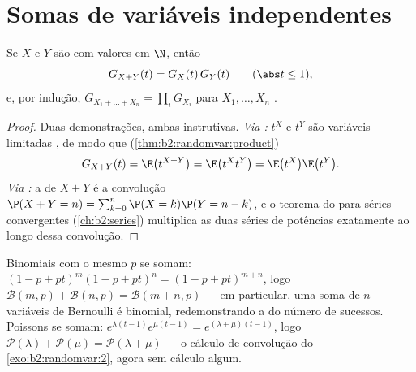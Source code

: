 \section{Somas de variáveis independentes}

\begin{theorem}[Multiplicatividade]\label{thm:b2:genfun:product}
Se $X$ e $Y$ são   com valores em $\N$, então
\[
G_{X + Y}(t) = G_X(t)\,G_Y(t)
\qquad (\abs t \leq 1),
\]
e, por indução, $G_{X_1 + \dots + X_n} = \prod_i G_{X_i}$ para
$X_1, \dots, X_n$ .
\end{theorem}

\begin{proof}
Duas demonstrações, ambas instrutivas. \emph{Via :} $t^X$ e
$t^Y$ são variáveis limitadas , de modo que
(\cref{thm:b2:randomvar:product})
\[
G_{X+Y}(t) = \E\bigl(t^{X+Y}\bigr)
= \E\bigl(t^X t^Y\bigr)
= \E\bigl(t^X\bigr)\E\bigl(t^Y\bigr) .
\]
\emph{Via :} a  de $X + Y$ é a convolução
$\P(X + Y = n) = \sum_{k=0}^n \P(X = k)\P(Y = n - k)$, e o teorema
do  para séries  convergentes
(\cref{ch:b2:series}) multiplica as duas séries de potências exatamente
ao longo dessa convolução.
\end{proof}

\begin{example}\label{ex:b2:genfun:stability}
Binomiais  com o mesmo $p$ se somam: $(1 - p + pt)^m(1 -
p + pt)^n = (1 - p + pt)^{m+n}$, logo $\mathcal{B}(m, p) +
\mathcal{B}(n, p) = \mathcal{B}(m + n, p)$ --- em particular, uma soma
de $n$ variáveis de Bernoulli  é binomial, redemonstrando a
 do número de sucessos. Poissons  se somam:
$e^{\lambda(t-1)}e^{\mu(t-1)} = e^{(\lambda + \mu)(t-1)}$, logo
$\mathcal{P}(\lambda) + \mathcal{P}(\mu) = \mathcal{P}(\lambda +
\mu)$ --- o cálculo de convolução do
\cref{exo:b2:randomvar:2}, agora sem cálculo algum.
\end{example}

